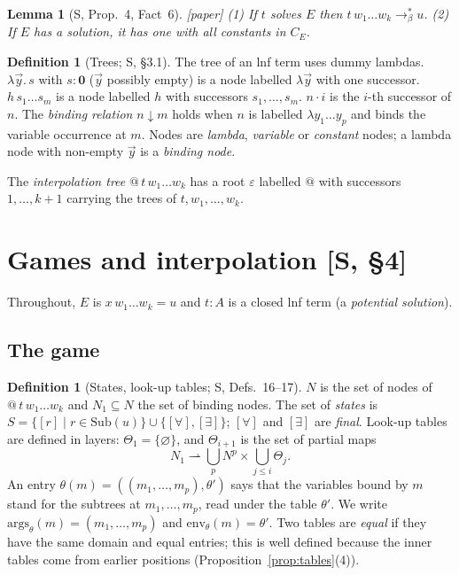 \documentclass[11pt]{article}
\newcommand{\Ground}{\mathbf{0}}
\newcommand{\Sub}{\mathrm{Sub}}
\newcommand{\bnd}{\mathrel{\downarrow}}
\newcommand{\suc}[2]{#1{\cdot}#2}
\newcommand{\CE}{C_E}
\newcommand{\args}{\mathrm{args}}
\newcommand{\env}{\mathrm{env}}
\newcommand{\Paper}{\textsf{[paper]}}
\theoremstyle{plain}
\newtheorem{lemma}[theorem]{Lemma}
\theoremstyle{definition}
\newtheorem{definition}[theorem]{Definition}
\theoremstyle{remark}
\begin{document}
\begin{lemma}[S, Prop.~4, Fact~6]\label{lem:reduces}
\Paper{} (1) If $t$ solves $E$ then $t\,w_1\dots w_k\to_\beta^*u$.
(2) If $E$ has a solution, it has one with all constants in $\CE$.
\end{lemma}

\begin{definition}[Trees; S, \S3.1]
The tree of an lnf term uses dummy lambdas.  $\lambda\vec y.\,s$ with
$s:\Ground$ ($\vec y$ possibly empty) is a node labelled $\lambda\vec y$
with one successor.  $h\,s_1\dots s_m$ is a node labelled $h$ with
successors $s_1,\dots,s_m$.  $\suc ni$ is the $i$-th successor of $n$.
The \emph{binding relation} $n\bnd m$ holds when $n$ is labelled
$\lambda y_1\dots y_p$ and binds the variable occurrence at $m$.  Nodes
are \emph{lambda}, \emph{variable} or \emph{constant} nodes; a lambda
node with non-empty $\vec y$ is a \emph{binding node}.

The \emph{interpolation tree} $@\,t\,w_1\dots w_k$ has a root
$\varepsilon$ labelled $@$ with successors $1,\dots,k+1$ carrying the
trees of $t,w_1,\dots,w_k$.
\end{definition}

\section{Games and interpolation [S, \S4]}\label{sec:games}

Throughout, $E$ is $x\,w_1\dots w_k=u$ and $t:A$ is a closed lnf term
(a \emph{potential solution}).

\subsection{The game}

\begin{definition}[States, look-up tables; S, Defs.~16--17]\label{def:tables}
$N$ is the set of nodes of $@\,t\,w_1\dots w_k$ and $N_1\subseteq N$ the
set of binding nodes.  The set of \emph{states} is
$S=\{[r]\mid r\in\Sub(u)\}\cup\{[\forall],[\exists]\}$; $[\forall]$ and
$[\exists]$ are \emph{final}.  Look-up tables are defined in layers:
$\Theta_1=\{\varnothing\}$, and $\Theta_{i+1}$ is the set of partial maps
\[
N_1\rightharpoonup \textstyle\bigcup_p N^p\times\bigcup_{j\le i}\Theta_j .
\]
An entry $\theta(m)=((m_1,\dots,m_p),\theta')$ says that the variables
bound by $m$ stand for the subtrees at $m_1,\dots,m_p$, read under the
table $\theta'$.  We write $\args_\theta(m)=(m_1,\dots,m_p)$ and
$\env_\theta(m)=\theta'$.  Two tables are \emph{equal} if they have the
same domain and equal entries; this is well defined because the inner
tables come from earlier positions (Proposition~\ref{prop:tables}(4)).
\end{definition}
\end{document}
